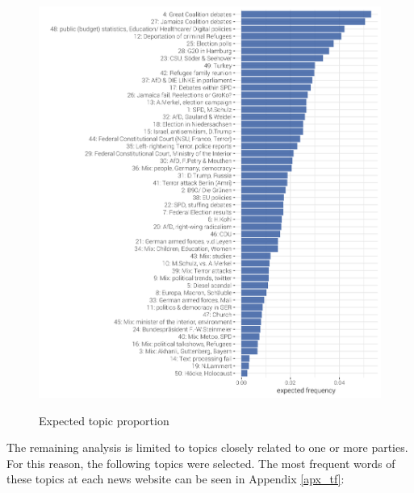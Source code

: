 \documentclass[12pt,a4paper,notitlepage]{article}
\begin{document}
\begin{figure}[H]
	\begin{center}
	\caption{Expected topic proportion}
		\includegraphics[width=\textwidth,keepaspectratio]{figs/topic_proportion.png}
		\label{fig_topic_proportion}
\end{center}
\end{figure}

The remaining analysis is limited to topics closely related to one or more parties. For this reason, the following topics were selected. The most frequent words of these topics at each news website can be seen in Appendix \ref{apx_tf}: 
\end{document}
